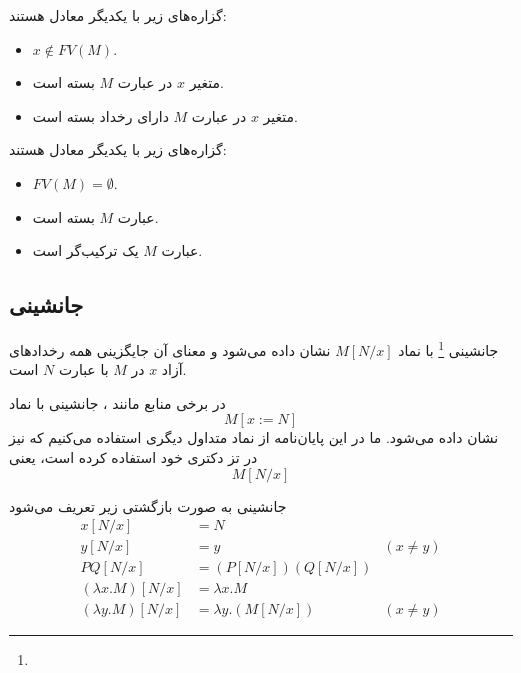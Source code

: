 \begin{prop}
گزاره‌های زیر با یکدیگر معادل هستند:
\begin{itemize}
\item $x \notin FV(M)$.
\item متغیر $x$ در عبارت $M$ بسته است.
\item متغیر $x$ در عبارت $M$ دارای رخداد بسته است.
\end{itemize}
\end{prop}

\begin{prop}
گزاره‌های زیر با یکدیگر معادل هستند:
\begin{itemize}
\item $FV(M) = \emptyset$.
\item عبارت $M$ بسته است.
\item عبارت $M$ یک ترکیب‌گر است.
\end{itemize}
\end{prop}

\subsection*{جانشینی}

جانشینی
\footnote{}
با نماد
$M[N/x]$
نشان داده می‌شود و معنای آن جایگزینی همه رخدادهای آزاد
$x$
در
$M$
با عبارت
$N$
است.

\begin{rem}
در برخی منابع مانند
\cite{barendregt}،
جانشینی با نماد
\begin{equation*}
M[x:=N]
\end{equation*}
نشان داده می‌شود. ما در این پایان‌نامه از نماد متداول دیگری استفاده می‌کنیم که
نیز در تز دکتری خود استفاده کرده است، یعنی
\begin{equation*}
M[N/x]   
\end{equation*}
\end{rem}

\begin{defn}
جانشینی به صورت بازگشتی زیر تعریف می‌شود
\begin{align*}
x[N/x] &= N\\
y[N/x] &= y & (x \neq y) \\
PQ[N/x]&=(P[N/x])(Q[N/x])\\
(\lambda x.M)[N/x] &= \lambda x.M\\
(\lambda y.M)[N/x] &= \lambda y.(M[N/x]) & (x \neq y)
\end{align*}
\end{defn}

